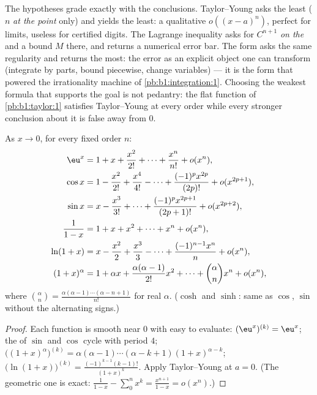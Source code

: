 \begin{remark}
The hypotheses grade exactly with the conclusions.
Taylor--Young asks the least ($n$  \emph{at the
point} only) and yields the least: a qualitative $o((x-a)^n)$,
perfect for limits, useless for certified digits. The Lagrange
inequality asks for $C^{n+1}$ \emph{on the } and a bound
$M$ there, and returns a numerical error bar. The  form
asks the same regularity and returns the most: the error as an
explicit object one can transform (integrate by parts, bound
piecewise, change variables) --- it is the form that powered the
irrationality machine of \cref{pb:b1:integration:1}. Choosing
the weakest formula that supports the goal is not pedantry: the
flat function of \cref{pb:b1:taylor:1} satisfies Taylor--Young
at every order while every stronger conclusion about it is
false away from $0$.
\end{remark}

\begin{proposition}
As $x \to 0$, for every fixed order $n$:
\begin{align*}
\eu^x &= 1 + x + \frac{x^2}{2!} + \dots + \frac{x^n}{n!} + o(x^n),\\
\cos x &= 1 - \frac{x^2}{2!} + \frac{x^4}{4!} - \dots
+ \frac{(-1)^p x^{2p}}{(2p)!} + o(x^{2p+1}),\\
\sin x &= x - \frac{x^3}{3!} + \dots + \frac{(-1)^p
x^{2p+1}}{(2p+1)!} + o(x^{2p+2}),\\
\frac{1}{1 - x} &= 1 + x + x^2 + \dots + x^n + o(x^n),\\
\ln(1 + x) &= x - \frac{x^2}{2} + \frac{x^3}{3} - \dots +
\frac{(-1)^{n-1} x^n}{n} + o(x^n),\\
(1 + x)^\alpha &= 1 + \alpha x + \frac{\alpha(\alpha-1)}{2!}x^2 +
\dots + \binom{\alpha}{n} x^n + o(x^n),
\end{align*}
where $\binom{\alpha}{n} = \frac{\alpha(\alpha - 1)\cdots(\alpha - n
+ 1)}{n!}$ for real $\alpha$. ($\cosh$ and $\sinh$: same as $\cos$,
$\sin$ without the alternating signs.)
\label{prop:b1:taylor:standard}
\end{proposition}

\begin{proof}
Each function is smooth near $0$ with  easy to evaluate:
$(\eu^x)^{(k)} = \eu^x$; the  of $\sin$ and $\cos$ cycle
with period $4$; $\bigl((1+x)^\alpha\bigr)^{(k)} = \alpha(\alpha -
1)\cdots(\alpha - k + 1)(1+x)^{\alpha - k}$;
$\bigl(\ln(1+x)\bigr)^{(k)} = \frac{(-1)^{k-1}(k-1)!}{(1+x)^k}$.
Apply Taylor--Young at $a = 0$. (The geometric one is exact:
$\frac{1}{1-x} - \sum_0^n x^k = \frac{x^{n+1}}{1 - x} = o(x^n)$.)
\end{proof}

